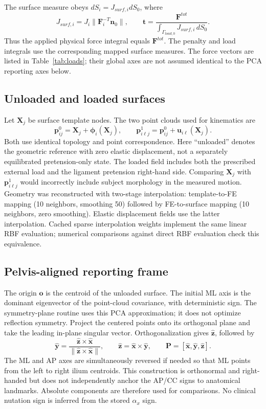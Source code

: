 The surface measure obeys $dS_i=J_{surf,i}dS_0$, where
\begin{equation}
J_{surf,i}=J_i\|\mathbf F_i^{-T}\mathbf n_0\|,\qquad
\mathbf t=\frac{\mathbf F^{tot}}{\int_{\Gamma_{load,0}}J_{surf,i}\,dS_0}.
\end{equation}
Thus the applied physical force integral equals $\mathbf F^{tot}$. The penalty and load integrals use the corresponding mapped surface measures. The force vectors are listed in Table~\ref{tab:loads}; their global axes are not assumed identical to the PCA reporting axes below.

\subsection{Unloaded and loaded surfaces}
Let $\mathbf X_j$ be surface template nodes. The two point clouds used for kinematics are
\begin{equation}
\mathbf p^0_{ij}=\mathbf X_j+\boldsymbol\phi_i(\mathbf X_j),\qquad
\mathbf p^1_{i\ell j}=\mathbf p^0_{ij}+\mathbf u_{i\ell}(\mathbf X_j).
\end{equation}
Both use identical topology and point correspondence. Here ``unloaded'' denotes the geometric reference with zero elastic displacement, not a separately equilibrated pretension-only state. The loaded field includes both the prescribed external load and the ligament pretension right-hand side. Comparing $\mathbf X_j$ with $\mathbf p^1_{i\ell j}$ would incorrectly include subject morphology in the measured motion. Geometry was reconstructed with two-stage interpolation: template-to-FE mapping (10 neighbors, smoothing 50) followed by FE-to-surface mapping (10 neighbors, zero smoothing). Elastic displacement fields use the latter interpolation. Cached sparse interpolation weights implement the same linear RBF evaluation; numerical comparisons against direct RBF evaluation check this equivalence.

\subsection{Pelvis-aligned reporting frame}
The origin $\mathbf o$ is the centroid of the unloaded surface. The initial ML axis is the dominant eigenvector of the point-cloud covariance, with deterministic sign. The symmetry-plane routine uses this PCA approximation; it does not optimize reflection symmetry. Project the centered points onto its orthogonal plane and take the leading in-plane singular vector. Orthogonalization gives $\hat{\mathbf z}$, followed by
\begin{equation}
\hat{\mathbf y}=\frac{\hat{\mathbf z}\times\hat{\mathbf x}}{\|\hat{\mathbf z}\times\hat{\mathbf x}\|},\qquad
\hat{\mathbf z}=\hat{\mathbf x}\times\hat{\mathbf y},\qquad
\mathbf P=[\hat{\mathbf x},\hat{\mathbf y},\hat{\mathbf z}].
\end{equation}
The ML and AP axes are simultaneously reversed if needed so that ML points from the left to right ilium centroids. This construction is orthonormal and right-handed but does not independently anchor the AP/CC signs to anatomical landmarks. Absolute components are therefore used for comparisons. No clinical nutation sign is inferred from the stored $\alpha_x$ sign.

